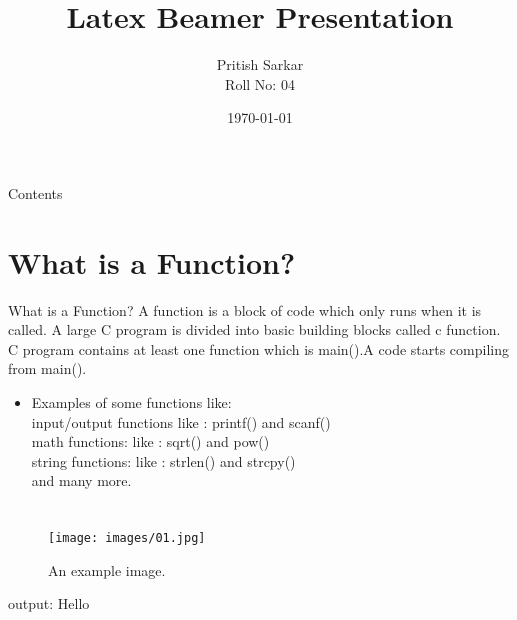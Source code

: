 \documentclass{beamer}
\title{Latex Beamer Presentation}
\author{Pritish Sarkar \\ Roll No: 04 }
\date{\today}
\begin{document}
\begin{frame}
    \titlepage
\end{frame}


\begin{frame}{Contents}
    \tableofcontents
\end{frame}


\section{What is a Function?}
\begin{frame}{What is a Function?}
A function is a block of code which only runs when it is called.
A large C program is divided into basic building blocks called c function.
C program contains at least one function which is main().A code  starts compiling from main().

    \begin{itemize}
        \item Examples of some functions like:\\ input/output functions 
					like : printf() and scanf()\\
				 math functions:
					like : sqrt() and pow()\\
				string functions: 
					like : strlen() and strcpy()\\
     
     and  many more.\\
    

        
    \end{itemize}
\end{frame}

\section{}
\begin{frame}{}

\begin{figure}
\centering
    \texttt{[image: images/01.jpg]}
\caption{An example image.}
\end{figure}
output: Hello
   
\end{frame}
\end{document}
